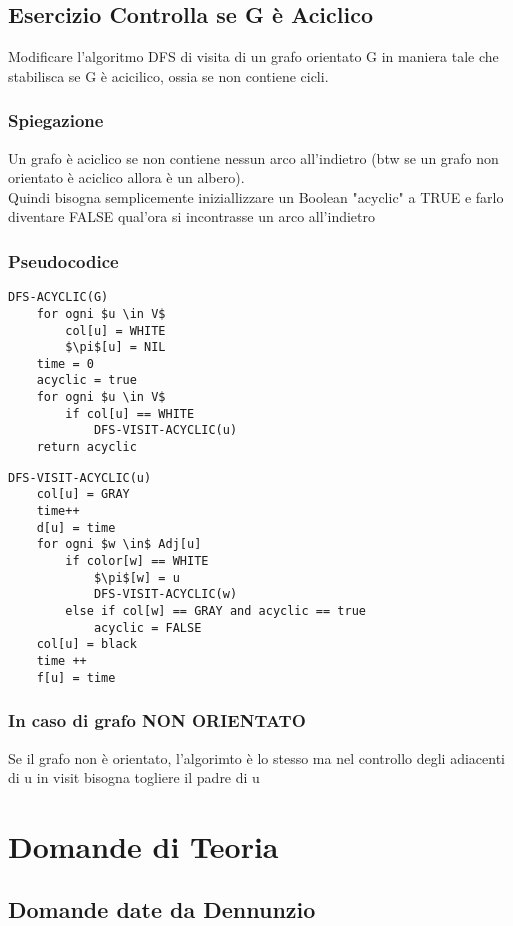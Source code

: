 \documentclass[12pt, a4paper, openany]{book}
\begin{document}
	\section{Esercizio Controlla se G è Aciclico}
	Modificare l’algoritmo DFS di visita di un grafo orientato G in maniera tale che stabilisca
	se G è acicilico, ossia se non contiene cicli.
	\subsection*{Spiegazione}
	Un grafo è aciclico se non contiene nessun arco all'indietro (btw se un grafo non orientato è aciclico allora è un albero).
	\\Quindi bisogna semplicemente iniziallizzare un Boolean "acyclic" a TRUE e farlo diventare FALSE qual'ora si incontrasse un arco all'indietro

	\subsection*{Pseudocodice}
	\begin{lstlisting}[mathescape=true]
DFS-ACYCLIC(G)
    for ogni $u \in V$
        col[u] = WHITE
        $\pi$[u] = NIL
    time = 0
    acyclic = true
    for ogni $u \in V$
        if col[u] == WHITE
            DFS-VISIT-ACYCLIC(u)
    return acyclic    
\end{lstlisting}

	\begin{lstlisting}[mathescape=true]
DFS-VISIT-ACYCLIC(u)
    col[u] = GRAY
    time++
    d[u] = time
    for ogni $w \in$ Adj[u]
        if color[w] == WHITE
            $\pi$[w] = u
            DFS-VISIT-ACYCLIC(w)
        else if col[w] == GRAY and acyclic == true
            acyclic = FALSE
    col[u] = black
    time ++
    f[u] = time
\end{lstlisting}

	\subsection*{In caso di grafo NON ORIENTATO}
	Se il grafo non è orientato, l'algorimto è lo stesso ma nel controllo degli adiacenti di u in visit bisogna togliere il padre di u

	\chapter{Domande di Teoria}

	\section{Domande date da Dennunzio}
\end{document}
